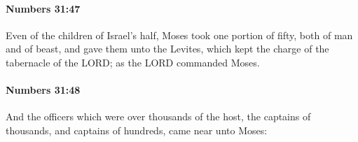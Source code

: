 		\paragraph{Numbers 31:47} %
			\label{NUMBERS-31-47}

			Even of the children of Israel’s half, Moses took one portion of fifty, both of man and of beast, and gave them unto the Levites, which kept the charge of the tabernacle of the LORD; as the LORD commanded Moses.


		\paragraph{Numbers 31:48} %
			\label{NUMBERS-31-48}

			And the officers which were over thousands of the host, the captains of thousands, and captains of hundreds, came near unto Moses:


